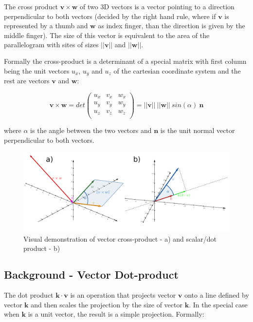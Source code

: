 The cross product $\bm{v} \times \bm{w}$ of two 3D vectors is a vector pointing to a direction perpendicular to both vectors (decided by the right hand rule, where if $\bm{v}$  is represented by a thumb and $\bm{w}$ as index finger, than the direction is given by the middle finger). The size of this vector is equivalent to the area of the parallelogram with sites of sizes $||\bm{v}||$ and $||\bm{w}||$.

Formally the cross-product is a determinant of a special matrix with first column being the unit vectors $u_x$, $u_y$ and $u_z$ of the cartesian coordinate system and the rest are vectors $\bm{v}$ and $\bm{w}$:

$$\bm{v} \times \bm{w} = det
\left(
\begin{array}{ccc}
    u_x & v_{x} & w_{x}\\
    u_y & v_{y} & w_{y}\\
    u_z & v_{z} & w_{z}\\
\end{array}
\right) = ||\bm{v}||~||\bm{w}||~sin(\alpha)~\bm{n}
$$

where $\alpha$ is the angle between the two vectors and $\bm{n}$ is the unit normal vector perpendicular to both vectors.

\begin{figure}
    \centering
    \includegraphics[scale=0.23]{imgs_tomas/vector_ops.png}
    \caption{Visual demonstration of vector cross-product - a) and scalar/dot product - b)}
    \label{fig:vector ops}
\end{figure}

\subsection{Background - Vector Dot-product}
The dot product $\bm{k} \cdot \bm{v}$ is an operation that projects vector $\bm{v}$ onto a line defined by vector $\bm{k}$ and then scales the projection by the size of vector $\bm{k}$. In the special case when $\bm{k}$ is a unit vector, the result is a simple projection. Formally:

